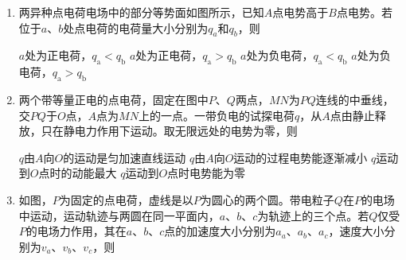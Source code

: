 

\begin{enumerate}[leftmargin=0em]
\renewcommand{\labelenumi}{\arabic{enumi}.}
\item
{}
两异种点电荷电场中的部分等势面如图所示，已知$ A $点电势高于$ B $点电势。若位于$ a $、$ b $处点电荷的电荷量大小分别为$ q_a $和$ q_b $，则  
\begin{figure}[h!]
\centering

\end{figure}

\fourchoices
{$ a $处为正电荷，$q _ { \mathrm { a } } < q _ { \mathrm { b } }$}
{$ a $处为正电荷，$q _ { \mathrm { a } } > q _ { \mathrm { b } }$}
{$ a $处为负电荷，$q _ { \mathrm { a } } < q _ { \mathrm { b } }$}
{$ a $处为负电荷，$q _ { \mathrm { a } } > q _ { \mathrm { b } }$}




\item
{}
两个带等量正电的点电荷，固定在图中$ P $、$ Q $两点，$ MN $为$ PQ $连线的中垂线，交$ PQ $于$ O $点，$ A $点为$ MN $上的一点。一带负电的试探电荷$ q $，从$ A $点由静止释放，只在静电力作用下运动。取无限远处的电势为零，则  
\begin{figure}[h!]
\centering

\end{figure}


\fourchoices
{$ q $由$ A $向$ O $的运动是匀加速直线运动 }
{$ q $由$ A $向$ O $运动的过程电势能逐渐减小}
{$ q $运动到$ O $点时的动能最大 }
{$ q $运动到$ O $点时电势能为零}




\item
{}
如图，$ P $为固定的点电荷，虚线是以$ P $为圆心的两个圆。带电粒子$ Q $在$ P $的电场中运动，运动轨迹与两圆在同一平面内，$ a $、$ b $、$ c $为轨迹上的三个点。若$ Q $仅受$ P $的电场力作用，其在$ a $、$ b $、$ c $点的加速度大小分别为$ a_a $、$ a_b $、$ a_c $，速度大小分别为$ v_a $、$ v_b $、$ v_c $，则  
\begin{figure}[h!]
\centering

\end{figure}


\end{enumerate}
